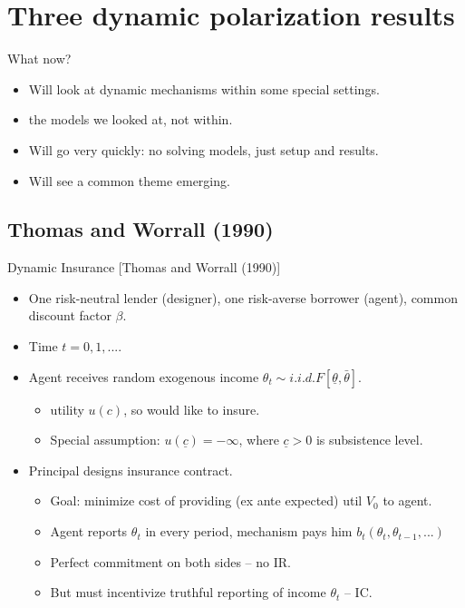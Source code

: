 \documentclass[english,10pt
,aspectratio=169
]{beamer}
\begin{document}
\section{Three dynamic polarization results}

\begin{frame}{What now?}
\begin{itemize}
	\item Will look at dynamic mechanisms within some special settings.
	\item {} the models we looked at, not \alert{within}.
	\item Will go very quickly: no solving models, just setup and results.
	\item Will see a common theme emerging.
\end{itemize}
\end{frame}


\subsection{Thomas and Worrall (1990)}

\begin{frame}{Dynamic Insurance [Thomas and Worrall (1990)]}
\begin{itemize}
	\item One risk-neutral lender (designer), one \alert{risk-averse} borrower (agent), common discount factor $\beta$.
	\item Time $t=0,1,...$.
	\item Agent receives random exogenous income $\theta_t \sim i.i.d. F[\underline{\theta},\bar{\theta}]$.
	\begin{itemize}
		\item {} utility $u(c)$, so would like to insure.
		\item Special assumption: $u(\underline{c}) = -\infty$, where $\underline{c}>0$ is subsistence level.
	\end{itemize}
	\item Principal designs insurance contract.
	\begin{itemize}
		\item Goal: minimize cost of providing (ex ante expected) util $V_0$ to agent.
		\item Agent reports $\theta_t$ in every period, mechanism pays him $b_t(\theta_t, \theta_{t-1}, ...)$
		\item Perfect commitment on both sides -- no IR.
		\item But must incentivize truthful reporting of income $\theta_t$ -- IC.
	\end{itemize}
\end{itemize}
\end{frame}
\end{document}
